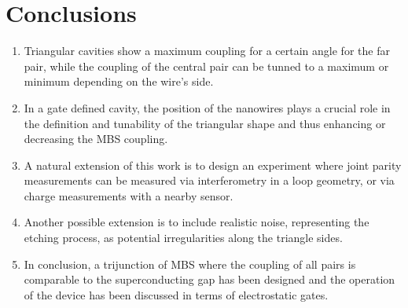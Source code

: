 \chapter{Conclusions}
\begin{enumerate}
\item Triangular cavities show a maximum coupling for a certain angle for the far pair, while the coupling of the central pair can be tunned to a maximum or minimum depending on the wire's side.
\item In a gate defined cavity, the position of the nanowires plays a crucial role in the definition and tunability of the triangular shape and thus enhancing or decreasing the MBS coupling.
\item A natural extension of this work is to design an experiment where joint parity measurements can be measured via interferometry in a loop geometry, or via charge measurements with a nearby sensor.
\item Another possible extension is to include realistic noise, representing the etching process, as potential irregularities along the triangle sides.
\item In conclusion, a trijunction of MBS where the coupling of all pairs is comparable to the superconducting gap has been designed and the operation of the device has been discussed in terms of electrostatic gates.
\end{enumerate}